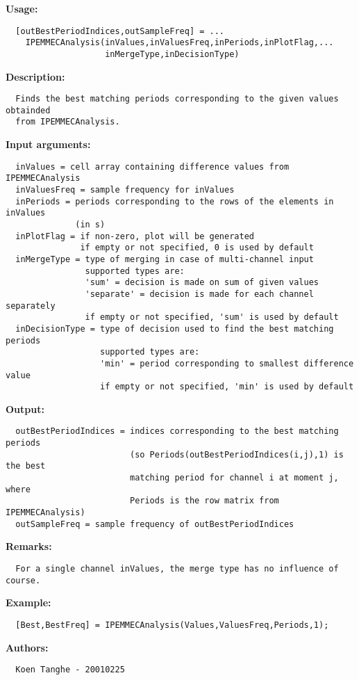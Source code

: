 \textbf{Usage:}
\begin{verbatim}  [outBestPeriodIndices,outSampleFreq] = ...
    IPEMMECAnalysis(inValues,inValuesFreq,inPeriods,inPlotFlag,...
                    inMergeType,inDecisionType)

\end{verbatim}
\textbf{Description:}
\begin{verbatim}  Finds the best matching periods corresponding to the given values obtainded
  from IPEMMECAnalysis.

\end{verbatim}
\textbf{Input arguments:}
\begin{verbatim}  inValues = cell array containing difference values from IPEMMECAnalysis
  inValuesFreq = sample frequency for inValues
  inPeriods = periods corresponding to the rows of the elements in inValues
              (in s)
  inPlotFlag = if non-zero, plot will be generated
               if empty or not specified, 0 is used by default
  inMergeType = type of merging in case of multi-channel input
                supported types are:
                'sum' = decision is made on sum of given values
                'separate' = decision is made for each channel separately
                if empty or not specified, 'sum' is used by default
  inDecisionType = type of decision used to find the best matching periods
                   supported types are:
                   'min' = period corresponding to smallest difference value
                   if empty or not specified, 'min' is used by default

\end{verbatim}
\textbf{Output:}
\begin{verbatim}  outBestPeriodIndices = indices corresponding to the best matching periods
                         (so Periods(outBestPeriodIndices(i,j),1) is the best
                         matching period for channel i at moment j, where
                         Periods is the row matrix from IPEMMECAnalysis)
  outSampleFreq = sample frequency of outBestPeriodIndices

\end{verbatim}
\textbf{Remarks:}
\begin{verbatim}  For a single channel inValues, the merge type has no influence of course.

\end{verbatim}
\textbf{Example:}
\begin{verbatim}  [Best,BestFreq] = IPEMMECAnalysis(Values,ValuesFreq,Periods,1);

\end{verbatim}
\textbf{Authors:}
\begin{verbatim}  Koen Tanghe - 20010225
\end{verbatim}


